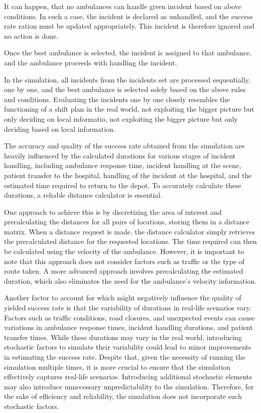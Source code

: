 It can happen, that no ambulances can handle given incident based on above
conditions. In such a case, the incident is declared as unhandled, and the
success rate ration must be updated appropriately. This incident is therefore
ignored and no action is done.

Once the best ambulance is selected, the incident is assigned to that
ambulance, and the ambulance proceeds with handling the incident.

In the simulation, all incidents from the incidents set are processed
sequentially, one by one, and the best ambulance is selected solely based on
the above rules and conditions. Evaluating the incidents one by one closely
resembles the functioning of a shift plan in the real world, not exploiting the
bigger picture but only deciding on local informatio, not exploiting the bigger
picture but only deciding based on local information.

The accuracy and quality of the success rate obtained from the simulation are
heavily influenced by the calculated durations for various stages of incident
handling, including ambulance response time, incident handling at the scene,
patient transfer to the hospital, handling of the incident at the hospital, and
the estimated time required to return to the depot. To accurately calculate
these durations, a reliable distance calculator is essential.

One approach to achieve this is by discretizing the area of interest and
precalculating the distances for all pairs of locations, storing them in a
distance matrix. When a distance request is made, the distance calculator
simply retrieves the precalculated distance for the requested locations. The
time required can then be calculated using the velocity of the ambulance.
However, it is important to note that this approach does not consider factors
such as traffic or the type of route taken. A more advanced approach involves
precalculating the estimated duration, which also eliminates the need for the
ambulance's velocity information.

Another factor to account for which might negatively influence the quality of
yielded success rate is that the variability of durations in real-life
scenarios vary. Factors such as traffic conditions, road closures, and
unexpected events can cause variations in ambulance response times, incident
handling durations, and patient transfer times. While these durations may vary
in the real world, introducing stochastic factors to simulate their variability
could lead to minor improvements in estimating the success rate. Despite that,
given the necessity of running the simulation multiple times, it is more
crucial to ensure that the simulation effectively captures real-life scenarios.
Introducing additional stochastic elements may also introduce unnecessary
unpredictability to the simulation. Therefore, for the sake of efficiency and
reliability, the simulation does not incorporate such stochastic factors.